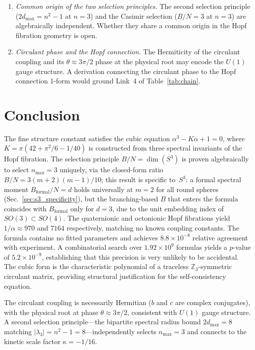 \documentclass[aps,prl,twocolumn,superscriptaddress]{revtex4-2}
\begin{document}
\begin{enumerate}
\item \textit{Common origin of the two selection principles.} The
  second selection principle ($2d_{\max} = n^2 - 1$ at $n = 3$) and
  the Casimir selection ($B/N = 3$ at $n = 3$) are algebraically
  independent. Whether they share a common origin in the Hopf
  fibration geometry is open.

\item \textit{Circulant phase and the Hopf connection.} The
  Hermiticity of the circulant coupling and its $\theta \approx
  3\pi/2$ phase at the physical root may encode the $U(1)$ gauge
  structure. A derivation connecting the circulant phase to the Hopf
  connection 1-form would ground Link~4 of
  Table~\ref{tab:chain}.
\end{enumerate}


\section{Conclusion}

The fine structure constant satisfies the cubic equation
$\alpha^3 - K\alpha + 1 = 0$, where
$K = \pi(42 + \pi^2/6 - 1/40)$ is constructed from three spectral
invariants of the Hopf fibration. The selection principle
$B/N = \dim(S^3)$ is proven algebraically to select $n_{\max} = 3$
uniquely, via the closed-form ratio $B/N = 3(m+2)(m-1)/10$; this
result is specific to~$S^3$: a formal spectral moment
$B_{\mathrm{formal}}/N = d$ holds universally at $m = 2$ for all
round spheres (Sec.~\ref{sec:s3_specificity}), but the
branching-based $B$ that enters the formula coincides with
$B_{\mathrm{formal}}$ only for $d = 3$, due to the unit embedding
index of $SO(3) \subset SO(4)$. The quaternionic and octonionic Hopf
fibrations yield $1/\alpha \approx 970$ and $7164$ respectively,
matching no known coupling constants. The formula contains no fitted parameters and achieves
$8.8 \times 10^{-8}$ relative agreement with experiment. A
combinatorial search over $1.92 \times 10^9$ formulas yields a
$p$-value of $5.2 \times 10^{-9}$, establishing that this precision
is very unlikely to be accidental. The cubic form is the
characteristic polynomial of a traceless $\mathbb{Z}_3$-symmetric
circulant matrix, providing structural justification for the
self-consistency equation.

The circulant coupling is necessarily Hermitian ($b$ and $c$ are
complex conjugates), with the physical root at phase
$\theta \approx 3\pi/2$, consistent with $U(1)$ gauge structure. A
second selection principle---the bipartite spectral radius bound
$2d_{\max} = 8$ matching $|\lambda_3| = n^2 - 1 = 8$---independently
selects $n_{\max} = 3$ and connects to the kinetic scale factor
$\kappa = -1/16$.
\end{document}
